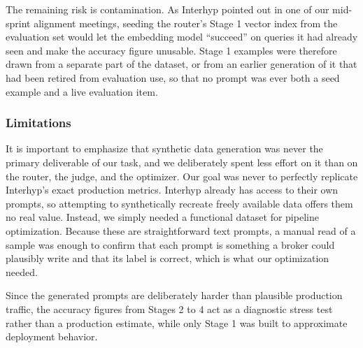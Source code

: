 The remaining risk is contamination. As Interhyp pointed out in one of our mid-sprint alignment meetings, seeding the router's Stage 1 vector index from the evaluation set would let the embedding model \enquote{succeed} on queries it had already seen and make the accuracy figure unusable. Stage 1 examples were therefore drawn from a separate part of the dataset, or from an earlier generation of it that had been retired from evaluation use, so that no prompt was ever both a seed example and a live evaluation item.

\subsubsection{Limitations}\label{sec:dataset-limitations}

It is important to emphasize that synthetic data generation was never the primary deliverable of our task, and we deliberately spent less effort on it than on the router, the judge, and the optimizer. Our goal was never to perfectly replicate Interhyp's exact production metrics. Interhyp already has access to their own prompts, so attempting to synthetically recreate freely available data offers them no real value. Instead, we simply needed a functional dataset for pipeline optimization. Because these are straightforward text prompts, a manual read of a sample was enough to confirm that each prompt is something a broker could plausibly write and that its label is correct, which is what our optimization needed.

Since the generated prompts are deliberately harder than plausible production traffic, the accuracy figures from Stages 2 to 4 act as a diagnostic stress test rather than a production estimate, while only Stage 1 was built to approximate deployment behavior.
